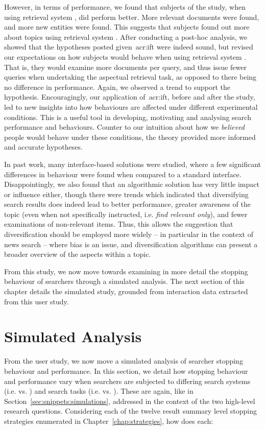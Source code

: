 However, in terms of performance, we found that subjects of the study, when using retrieval system , did perform better. More relevant documents were found, and more new entities were found. This suggests that subjects found out more about topics using retrieval system . After conducting a post-hoc analysis, we showed that the hypotheses posted given~\gls{acr:ift} were indeed sound, but revised our expectations on how subjects would behave when using retrieval system . That is, they would examine more documents per query, and thus issue fewer queries when undertaking the aspectual retrieval task, as opposed to there being no difference in performance. Again, we observed a trend to support the hypothesis. Encouragingly, our application of~\gls{acr:ift}, before and after the study, led to new insights into how behaviours are affected under different experimental conditions. This is a useful tool in developing, motivating and analysing search performance and behaviours. Counter to our intuition about how we \emph{believed} people would behave under these conditions, the theory provided more informed and accurate hypotheses.

In past work, many interface-based solutions were studied, where a few significant differences in behaviour were found when compared to a standard interface. Disappointingly, we also found that an algorithmic solution has very little impact or influence either, though there were trends which indicated that diversifying search results does indeed lead to better performance, greater awareness of the topic (even when not specifically instructed, i.e. \emph{find relevant only}), and fewer examinations of non-relevant items. Thus, this allows the suggestion that diversification should be employed more widely -- in particular in the context of news search -- where bias is an issue, and diversification algorithms can present a broader overview of the aspects within a topic.

From this study, we now move towards examining in more detail the stopping behaviour of searchers through a simulated analysis. The next section of this chapter details the simulated study, grounded from interaction data extracted from this user study.

\section{Simulated Analysis}\label{sec:diversity:simulated}
From the user study, we now move a simulated analysis of searcher stopping behaviour and performance. In this section, we detail how stopping behaviour and performance vary when searchers are subjected to differing search systems (i.e.  vs. ) and search tasks (i.e.  vs. ). These are again, like in Section~\ref{sec:snippets:simulations}, addressed in the context of the two high-level research questions. Considering each of the twelve result summary level stopping strategies enumerated in Chapter~\ref{chap:strategies}, how does each:

